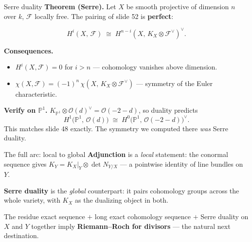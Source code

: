 \documentclass[aspectratio=169,12pt]{beamer}
\newenvironment{mathbox}{%
  \begin{tcolorbox}[mathbox]}{%
  \end{tcolorbox}}
\begin{document}
\begin{frame}{Serre duality}
  \textbf{Theorem (Serre).}\enspace
  Let $X$ be smooth projective of dimension $n$ over $k$,
  $\mathcal{F}$ locally free.
  The pairing of slide 52 is \textbf{perfect}:
  \begin{mathbox}
  \[
    H^i(X,\, \mathcal{F})
    \;\cong\;
    H^{n-i}(X,\, K_X \otimes \mathcal{F}^\vee)^\vee.
  \]
  \end{mathbox}

  \textbf{Consequences.}
  \begin{itemize}
    \item $H^i(X, \mathcal{F}) = 0$ for $i > n$ — cohomology vanishes above dimension.
    \item $\chi(X, \mathcal{F}) = (-1)^n\,\chi(X,\, K_X \otimes \mathcal{F}^\vee)$
          — symmetry of the Euler characteristic.
  \end{itemize}

  \medskip

  \textbf{Verify on $\mathbb{P}^1$.}\enspace
  $K_{\mathbb{P}^1} \otimes \mathcal{O}(d)^\vee = \mathcal{O}(-2-d)$, so duality predicts
  \[
    H^1\bigl(\mathbb{P}^1,\, \mathcal{O}(d)\bigr)
    \;\cong\;
    H^0\bigl(\mathbb{P}^1,\, \mathcal{O}(-2-d)\bigr)^\vee.
  \]
  This matches slide 48 exactly.
  The symmetry we computed there \emph{was} Serre duality.
\end{frame}

\begin{frame}{The full arc: local to global}
  \textbf{Adjunction} is a \emph{local} statement:
  the conormal sequence gives $K_Y = K_X|_Y \otimes \det N_{Y/X}$
  — a pointwise identity of line bundles on $Y$.

  \textbf{Serre duality} is the \emph{global} counterpart:
  it pairs cohomology groups across the whole variety,
  with $K_X$ as the dualizing object in both.

  \medskip

  \begin{center}
  \end{center}

  \medskip

  The residue exact sequence $+$ long exact cohomology sequence $+$
  Serre duality on $X$ and $Y$ together imply
  \textbf{Riemann--Roch for divisors} — the natural next destination.
\end{frame}
\end{document}
